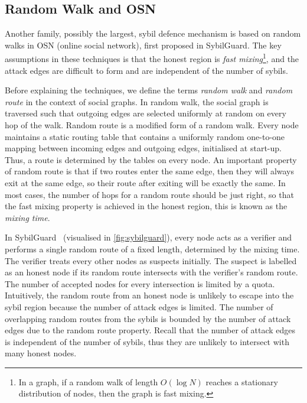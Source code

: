 \subsection{Random Walk and OSN}\label{sec:random-walk}
Another family, possibly the largest, sybil defence mechanism is based on random
walks in OSN (online social network), first proposed in
SybilGuard\cite{yu2006sybilguard}. The key assumptions in these techniques is
that the honest region is \emph{fast mixing}\footnote{In a graph, if a random
  walk of length $O(\log{N})$ reaches a stationary distribution of nodes, then
  the graph is fast mixing.}, and the attack edges are difficult to form and are
independent of the number of sybils.


Before explaining the techniques, we define the terms \emph{random walk} and
\emph{random route} in the context of social graphs. In random walk, the social
graph is traversed such that outgoing edges are selected uniformly at random on
every hop of the walk. Random route is a modified form of a random walk. Every
node maintains a static routing table that contains a uniformly random
one-to-one mapping between incoming edges and outgoing edges, initialised at
start-up. Thus, a route is determined by the tables on every node. An important
property of random route is that if two routes enter the same edge, then they
will always exit at the same edge, so their route after exiting will be exactly
the same. In most cases, the number of hops for a random route should be just
right, so that the fast mixing property is achieved in the honest region, this
is known as the \emph{mixing time}.

In SybilGuard~\cite{yu2006sybilguard} (visualised in \autoref{fig:sybilguard}),
every node acts as a verifier and performs a single random route of a fixed
length, determined by the mixing time. The verifier treats every other nodes as
suspects initially. The suspect is labelled as an honest node if its random
route intersects with the verifier's random route. The number of accepted nodes
for every intersection is limited by a quota. Intuitively, the random route from
an honest node is unlikely to escape into the sybil region because the number of
attack edges is limited. The number of overlapping random routes from the sybils
is bounded by the number of attack edges due to the random route property.
Recall that the number of attack edges is independent of the number of sybils,
thus they are unlikely to intersect with many honest nodes.

